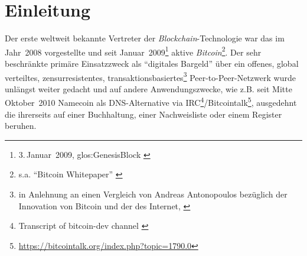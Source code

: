 






\chapter{Einleitung}\label{einleitung}


Der erste weltweit bekannte Vertreter der \emph{Blockchain}-Technologie war das im Jahr~2008 vorgestellte und seit Januar~2009\footnote{3.\,Januar~2009, \gls{glos:GenesisBlock} \autocite{w:bitcoin-wiki}} aktive \emph{Bitcoin}\footnote{s.a. \enquote{Bitcoin Whitepaper} \autocite{p:bitcoin}}. Der sehr beschränkte primäre Einsatzzweck als \enquote{digitales Bargeld} über ein offenes, global verteiltes, zensurresistentes, transaktionsbasiertes\footnote{in Anlehnung an einen Vergleich von Andreas Antonopoulos bezüglich der Innovation von Bitcoin und der des Internet, \autocite{o:open-blockchain}} Peer-to-Peer-Netzwerk  wurde unlängst weiter gedacht und auf andere Anwendungszwecke, wie z.B. seit Mitte Oktober~2010 Namecoin als DNS-Alternative via IRC\footnote{Transcript of bitcoin-dev channel \autocite{w:irc-ts-bitcoindev}}/Bitcointalk\footnote{\url{https://bitcointalk.org/index.php?topic=1790.0}}, ausgedehnt die ihrerseits auf einer Buchhaltung, einer Nachweisliste oder einem Register beruhen.

